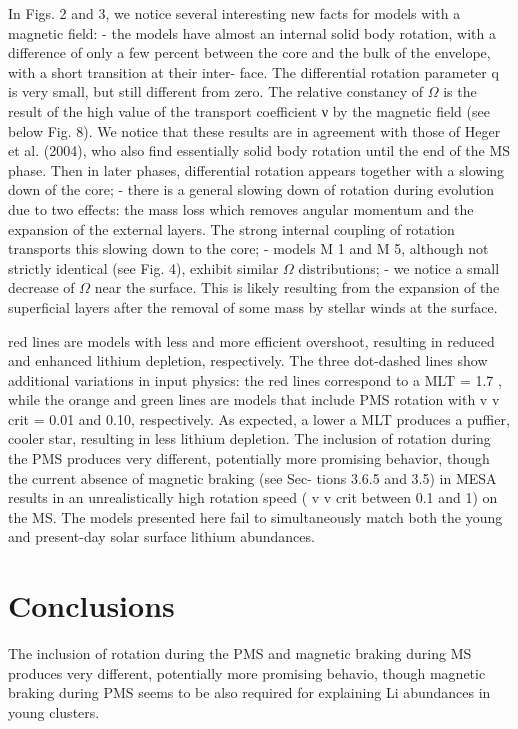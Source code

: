 \documentclass[fleqn,usenatbib]{mnras}
\begin{document}
In Figs. 2 and 3, we notice several interesting new facts for models with a magnetic field:
- the models have almost an internal solid body rotation, with a difference of only a few percent between the core and the bulk of the envelope, with a short transition at their inter- face. The differential rotation parameter q is very small, but still different from zero. The relative constancy of $\Omega$ is the result of the high value of the transport coefficient ν by the magnetic field (see below Fig. 8). We notice that these results are in agreement with those of Heger et al. (2004), who also find essentially solid body rotation until the end of the MS phase. Then in later phases, differential rotation appears together with a slowing down of the core;
- there is a general slowing down of rotation during evolution due to two effects: the mass loss which removes angular momentum and the expansion of the external layers. The strong internal coupling of rotation transports this slowing down to the core;
- models M 1 and M 5, although not strictly identical (see Fig. 4), exhibit similar $\Omega$ distributions;
- we notice a small decrease of $\Omega$ near the surface. This is likely resulting from the expansion of the superficial layers after the removal of some mass by stellar winds at the surface.


red lines are models with less and more efficient overshoot, resulting in reduced and enhanced lithium depletion, respectively. The three dot-dashed lines show additional variations in input
physics: the red lines correspond to a MLT = 1.7 , while the orange and green lines are models that include PMS rotation with v v crit = 0.01 and 0.10, respectively. As expected, a lower a MLT produces a puffier, cooler star, resulting in less lithium depletion. The inclusion of rotation during the PMS produces very different, potentially more promising behavior, though the current absence of magnetic braking (see Sec-
tions 3.6.5 and 3.5) in MESA results in an unrealistically high rotation speed ( v v crit between 0.1 and 1) on the MS. The models presented here fail to simultaneously match both the young and present-day solar surface lithium abundances.





\section{Conclusions}
The inclusion of rotation during the PMS and magnetic braking during MS produces very different, potentially more promising behavio, though magnetic braking during PMS seems to be also required for explaining Li abundances in young clusters.
\end{document}
